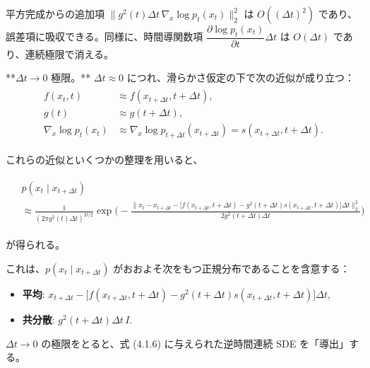 平方完成からの追加項 $\|g^2(t)\Delta t\,\nabla_x\log p_t(x_t)\|_2^2$ は $O((\Delta t)^2)$ であり、誤差項に吸収できる。同様に、時間導関数項 $\dfrac{\partial\log p_t(x_t)}{\partial t}\Delta t$ は $O(\Delta t)$ であり、連続極限で消える。

**$\Delta t\to 0$ 極限。** $\Delta t\approx 0$ につれ、滑らかさ仮定の下で次の近似が成り立つ：
\begin{align*}
\begin{aligned}
f(x_t,t)&\approx f(x_{t+\Delta t},t+\Delta t), \\
g(t)&\approx g(t+\Delta t), \\
\nabla_x\log p_t(x_t)
&\approx\nabla_x\log p_{t+\Delta t}(x_{t+\Delta t})
=s(x_{t+\Delta t},t+\Delta t).
\end{aligned}
\end{align*}


これらの近似といくつかの整理を用いると、

\begin{align*}
\begin{aligned}
&p(x_t\mid x_{t+\Delta t}) \\
&\approx\frac{1}{(2\pi g^2(t)\Delta t)^{D/2}}
\exp\Biggl(
-\frac{
\bigl\|
x_t-x_{t+\Delta t}
-\bigl[f(x_{t+\Delta t},t+\Delta t)-g^2(t+\Delta t)s(x_{t+\Delta t},t+\Delta t)\bigr]\Delta t
\bigr\|_2^2
}{2g^2(t+\Delta t)\Delta t}
\Biggr)
\end{aligned}
\end{align*}


が得られる。

これは、$p(x_t\mid x_{t+\Delta t})$ がおおよそ次をもつ正規分布であることを含意する：

\begin{itemize}
\item \textbf{平均}: $x_{t+\Delta t}-\bigl[f(x_{t+\Delta t},t+\Delta t)-g^2(t+\Delta t)s(x_{t+\Delta t},t+\Delta t)\bigr]\Delta t$,
\item \textbf{共分散}: $g^2(t+\Delta t)\Delta t\, I$.
\end{itemize}


$\Delta t\to 0$ の極限をとると、式 (4.1.6) に与えられた逆時間連続 SDE を「導出」する。


